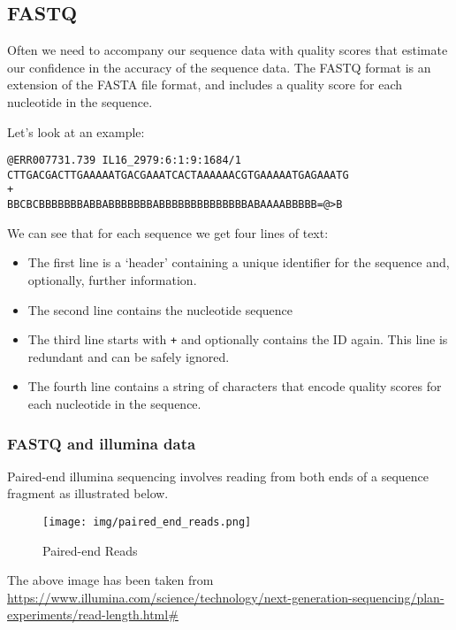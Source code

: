 \documentclass[11pt]{article}
\providecommand{\tightlist}{%
      \setlength{\itemsep}{0pt}\setlength{\parskip}{0pt}}
\begin{document}
\hypertarget{fastq}{%
\subsection{FASTQ}\label{fastq}}

Often we need to accompany our sequence data with quality scores that
estimate our confidence in the accuracy of the sequence data. The FASTQ
format is an extension of the FASTA file format, and includes a quality
score for each nucleotide in the sequence.

Let's look at an example:

\begin{verbatim}
@ERR007731.739 IL16_2979:6:1:9:1684/1
CTTGACGACTTGAAAAATGACGAAATCACTAAAAAACGTGAAAAATGAGAAATG
+
BBCBCBBBBBBBABBABBBBBBBABBBBBBBBBBBBBBABAAAABBBBB=@>B
\end{verbatim}

We can see that for each sequence we get four lines of text:

\begin{itemize}
\tightlist
\item
  The first line is a `header' containing a unique identifier for the
  sequence and, optionally, further information.
\item
  The second line contains the nucleotide sequence
\item
  The third line starts with \texttt{+} and optionally contains the ID
  again. This line is redundant and can be safely ignored.
\item
  The fourth line contains a string of characters that encode quality
  scores for each nucleotide in the sequence.
\end{itemize}

    \hypertarget{fastq-and-illumina-data}{%
\subsubsection{FASTQ and illumina data}\label{fastq-and-illumina-data}}

Paired-end illumina sequencing involves reading from both ends of a
sequence fragment as illustrated below.

    \begin{figure}
\centering
\texttt{[image: img/paired\_end\_reads.png]}
\caption{Paired-end Reads}
\end{figure}

    The above image has been taken from
\url{https://www.illumina.com/science/technology/next-generation-sequencing/plan-experiments/read-length.html\#}
\end{document}
